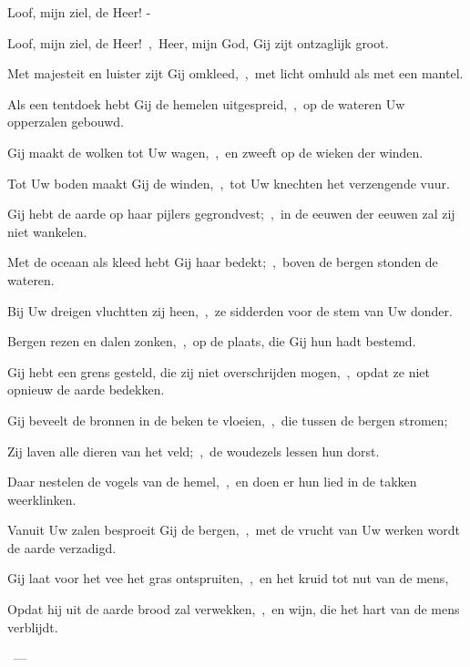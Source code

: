 \documentclass[12pt,twoside,a5paper]{article}
\begin{document}
\begin{halfparskip}
   Loof, mijn ziel, de Heer! - 

  Loof, mijn ziel, de Heer!~\sep\ Heer, mijn God, Gij zijt ontzaglijk groot.

  Met majesteit en luister zijt Gij omkleed,~\sep\ met licht omhuld als met een mantel.

  Als een tentdoek hebt Gij de hemelen uitgespreid,~\sep\ op de wateren Uw opperzalen gebouwd.

  Gij maakt de wolken tot Uw wagen,~\sep\ en zweeft op de wieken der winden.

  Tot Uw boden maakt Gij de winden,~\sep\ tot Uw knechten het verzengende vuur.

  Gij hebt de aarde op haar pijlers gegrondvest;~\sep\ in de eeuwen der eeuwen zal zij niet wankelen.

  Met de oceaan als kleed hebt Gij haar bedekt;~\sep\ boven de bergen stonden de wateren.

  Bij Uw dreigen vluchtten zij heen,~\sep\ ze sidderden voor de stem van Uw donder.

  Bergen rezen en dalen zonken,~\sep\ op de plaats, die Gij hun hadt bestemd.

  Gij hebt een grens gesteld, die zij niet overschrijden mogen,~\sep\ opdat ze niet opnieuw de aarde bedekken.

  Gij beveelt de bronnen in de beken te vloeien,~\sep\ die tussen de bergen stromen;

  Zij laven alle dieren van het veld;~\sep\ de woudezels lessen hun dorst.

  Daar nestelen de vogels van de hemel,~\sep\ en doen er hun lied in de takken weerklinken.

  Vanuit Uw zalen besproeit Gij de bergen,~\sep\ met de vrucht van Uw werken wordt de aarde verzadigd.

  Gij laat voor het vee het gras ontspruiten,~\sep\ en het kruid tot nut van de mens,

  Opdat hij uit de aarde brood zal verwekken,~\sep\ en wijn, die het hart van de mens verblijdt.

  ~--- 
\end{halfparskip}
\end{document}

